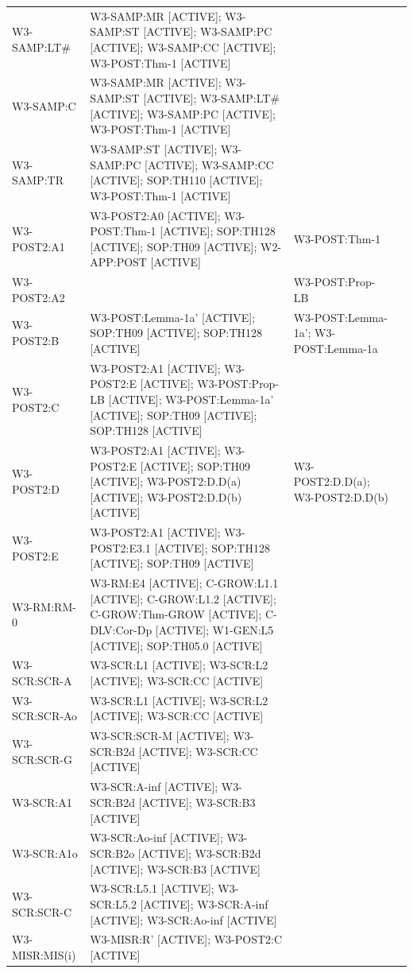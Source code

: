 \begin{longtable}{p{2.6cm}p{7cm}p{2.6cm}p{2cm}}
W3-SAMP:LT\# & W3-SAMP:MR [ACTIVE]; W3-SAMP:ST [ACTIVE]; W3-SAMP:PC [ACTIVE]; W3-SAMP:CC [ACTIVE]; W3-POST:Thm-1 [ACTIVE] &  &  \\
W3-SAMP:C & W3-SAMP:MR [ACTIVE]; W3-SAMP:ST [ACTIVE]; W3-SAMP:LT\# [ACTIVE]; W3-SAMP:PC [ACTIVE]; W3-POST:Thm-1 [ACTIVE] &  &  \\
W3-SAMP:TR & W3-SAMP:ST [ACTIVE]; W3-SAMP:PC [ACTIVE]; W3-SAMP:CC [ACTIVE]; SOP:TH110 [ACTIVE]; W3-POST:Thm-1 [ACTIVE] &  &  \\
W3-POST2:A1 & W3-POST2:A0 [ACTIVE]; W3-POST:Thm-1 [ACTIVE]; SOP:TH128 [ACTIVE]; SOP:TH09 [ACTIVE]; W2-APP:POST [ACTIVE] & W3-POST:Thm-1 &  \\
W3-POST2:A2 &  & W3-POST:Prop-LB &  \\
W3-POST2:B & W3-POST:Lemma-1a' [ACTIVE]; SOP:TH09 [ACTIVE]; SOP:TH128 [ACTIVE] & W3-POST:Lemma-1a'; W3-POST:Lemma-1a &  \\
W3-POST2:C & W3-POST2:A1 [ACTIVE]; W3-POST2:E [ACTIVE]; W3-POST:Prop-LB [ACTIVE]; W3-POST:Lemma-1a' [ACTIVE]; SOP:TH09 [ACTIVE]; SOP:TH128 [ACTIVE] &  &  \\
W3-POST2:D & W3-POST2:A1 [ACTIVE]; W3-POST2:E [ACTIVE]; SOP:TH09 [ACTIVE]; W3-POST2:D.D(a) [ACTIVE]; W3-POST2:D.D(b) [ACTIVE] & W3-POST2:D.D(a); W3-POST2:D.D(b) &  \\
W3-POST2:E & W3-POST2:A1 [ACTIVE]; W3-POST2:E3.1 [ACTIVE]; SOP:TH128 [ACTIVE]; SOP:TH09 [ACTIVE] &  &  \\
W3-RM:RM-0 & W3-RM:E4 [ACTIVE]; C-GROW:L1.1 [ACTIVE]; C-GROW:L1.2 [ACTIVE]; C-GROW:Thm-GROW [ACTIVE]; C-DLV:Cor-Dp [ACTIVE]; W1-GEN:L5 [ACTIVE]; SOP:TH05.0 [ACTIVE] &  &  \\
W3-SCR:SCR-A & W3-SCR:L1 [ACTIVE]; W3-SCR:L2 [ACTIVE]; W3-SCR:CC [ACTIVE] &  &  \\
W3-SCR:SCR-Ao & W3-SCR:L1 [ACTIVE]; W3-SCR:L2 [ACTIVE]; W3-SCR:CC [ACTIVE] &  &  \\
W3-SCR:SCR-G & W3-SCR:SCR-M [ACTIVE]; W3-SCR:B2d [ACTIVE]; W3-SCR:CC [ACTIVE] &  &  \\
W3-SCR:A1 & W3-SCR:A-inf [ACTIVE]; W3-SCR:B2d [ACTIVE]; W3-SCR:B3 [ACTIVE] &  &  \\
W3-SCR:A1o & W3-SCR:Ao-inf [ACTIVE]; W3-SCR:B2o [ACTIVE]; W3-SCR:B2d [ACTIVE]; W3-SCR:B3 [ACTIVE] &  &  \\
W3-SCR:SCR-C & W3-SCR:L5.1 [ACTIVE]; W3-SCR:L5.2 [ACTIVE]; W3-SCR:A-inf [ACTIVE]; W3-SCR:Ao-inf [ACTIVE] &  &  \\
W3-MISR:MIS(i) & W3-MISR:R' [ACTIVE]; W3-POST2:C [ACTIVE] &  &  \\

\end{longtable}
